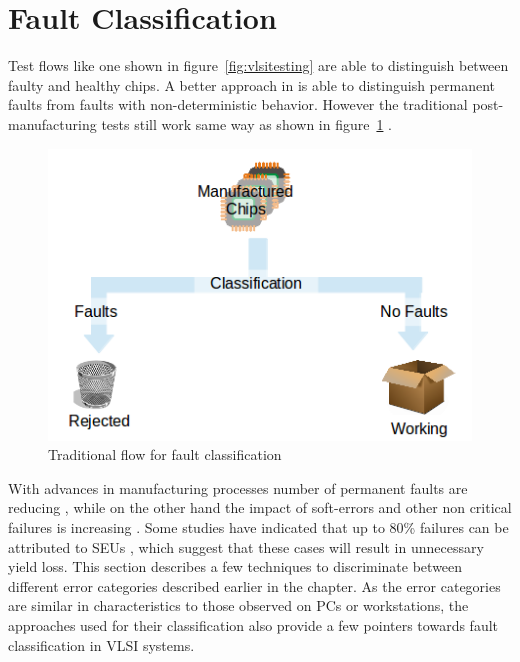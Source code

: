 \section{Fault Classification}
Test flows like one shown in figure~\ref{fig:vlsitesting} are able to distinguish between faulty and healthy chips. A better approach in \cite{DeKleer2009} is able to distinguish permanent faults from faults with non-deterministic behavior. However the traditional post-manufacturing tests still work same way as shown in figure~\ref{fig:traditionaltestflow} \cite{Weste1985}. 

\begin{figure}[h]
  \begin{center}
    \captionsetup{justification=centering}
    \includegraphics[scale=0.75]{figures/traditionaltestflow.png}
    \caption{Traditional flow for fault classification}
    \label{fig:traditionaltestflow}
  \end{center}
\end{figure}

With advances in manufacturing processes number of permanent faults are reducing \cite{kishore2009}, while on the other hand the impact of soft-errors and other non critical failures is increasing \cite{Constantinescu2003}. Some studies have indicated that up to 80\% failures can be attributed to SEUs \cite{Iyer1986, Dharchoudhury1994, kishore2009}, which suggest that these cases will result in unnecessary yield loss. This section describes a few techniques to discriminate between different error categories described earlier in the chapter. As the error categories are similar in characteristics to those observed on PCs or workstations, the approaches used for their classification also provide a few pointers towards fault classification in VLSI systems. 

